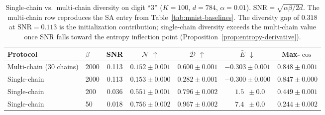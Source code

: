 \begin{table}[h]
\centering
\caption{Single-chain vs.\ multi-chain diversity on digit ``3'' ($K{=}100$, $d{=}784$, $\alpha{=}0.01$). $\mathrm{SNR}=\sqrt{\alpha\beta/2d}$. The multi-chain row reproduces the SA entry from Table~\ref{tab:mnist-baselines}. The diversity gap of $0.318$ at $\mathrm{SNR}{=}0.113$ is the initialization contribution; single-chain diversity exceeds the multi-chain value once SNR falls toward the entropy inflection point (Proposition~\ref{prop:entropy-derivative}).}
\label{tab:single-chain}
\small
\begin{tabular}{@{}llccccc@{}}
\toprule
Protocol & $\beta$ & SNR & $\mathcal{N}$ $\uparrow$ & $\bar{\mathcal{D}}$ $\uparrow$ & $\bar{E}$ $\downarrow$ & Max-$\cos$ \\
\midrule
Multi-chain (30 chains) & 2000 & 0.113 & $0.152 \pm 0.001$ & $0.600 \pm 0.001$ & $-0.303 \pm 0.001$ & $0.848 \pm 0.001$ \\
Single-chain            & 2000 & 0.113 & $0.153 \pm 0.000$ & $0.282 \pm 0.001$ & $-0.300 \pm 0.000$ & $0.847 \pm 0.000$ \\
Single-chain            & 200  & 0.036 & $0.551 \pm 0.001$ & $0.796 \pm 0.002$ & $\phantom{-}1.5\phantom{0} \pm 0.0\phantom{0}$ & $0.449 \pm 0.001$ \\
Single-chain            & 50   & 0.018 & $0.756 \pm 0.002$ & $0.967 \pm 0.002$ & $\phantom{-}7.4\phantom{0} \pm 0.0\phantom{0}$ & $0.244 \pm 0.002$ \\
\bottomrule
\end{tabular}
\end{table}

